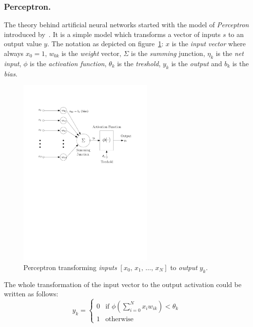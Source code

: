 \subsubsection{Perceptron.}
\label{sec:models-perceptron}

The theory behind artificial neural networks started with the model of \emph{Perceptron} introduced by~\citet{mcculloch1943logical}. It is a simple model which transforms a vector of inputs $s$ to an output value $y$. The notation as depicted on figure~\ref{fig:perceptron}: $x$ is the \emph{input vector} where always $x_0=1$, $w_{0k}$ is the \emph{weight} vector, $\Sigma$ is the \emph{summing} junction, $\eta_k$ is the \emph{net input}, $\phi$ is the \emph{activation function}, $\theta_k$ is the \emph{treshold}, $y_k$ is the \emph{output} and $b_k$ is the \emph{bias}.

\begin{figure}[H]
  \centering
  \includegraphics[width=0.6\textwidth]{img/perceptron.pdf}    
  \caption{Perceptron transforming \emph{inputs} $[x_0,\, x_1,\, \ldots,\, x_N]$ to \emph{output} $y_k$.} 
  \label{fig:perceptron}
\end{figure}

The whole transformation of the input vector to the output activation could be written as follows: 
\begin{equation}
\label{eq:perceptron} 
y_k =
\left\{
	\begin{array}{ll}
		0 & \mbox{if } \phi(\sum_{i=0}^N x_iw_{ik}) < \theta_k \\
		1 & \mbox{otherwise}
	\end{array}
\right.
\end{equation} 

